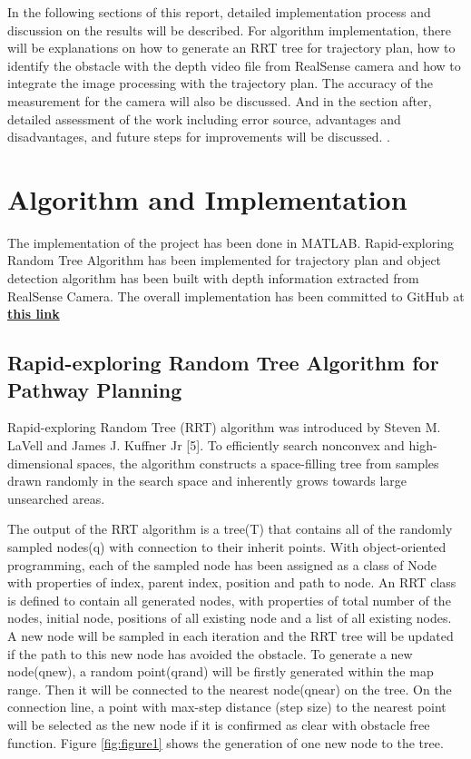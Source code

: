 \documentclass[
  oneside]{ubcthesis}
\begin{document}
In the following sections of this report, detailed implementation process and discussion on the results will be described. For algorithm implementation, there will be explanations on how to generate an RRT tree for trajectory plan, how to identify the obstacle with the depth video file from RealSense camera and how to integrate the image processing with the trajectory plan. The accuracy of the measurement for the camera will also be discussed. And in the section after, detailed assessment of the work including error source, advantages and disadvantages, and future steps for improvements will be discussed.
\citep{meyer2003pressures}.

\hypertarget{algorithm-and-implementation}{%
\chapter{Algorithm and Implementation}\label{algorithm-and-implementation}}

The implementation of the project has been done in MATLAB. Rapid-exploring Random Tree Algorithm has been implemented for trajectory plan and object detection algorithm has been built with depth information extracted from RealSense Camera. The overall implementation has been committed to GitHub at \textbf{\href{https://github.com/luckymeng7/EECE597}{this link}}

\hypertarget{rapid-exploring-random-tree-algorithm-for-pathway-planning}{%
\section{Rapid-exploring Random Tree Algorithm for Pathway Planning}\label{rapid-exploring-random-tree-algorithm-for-pathway-planning}}

Rapid-exploring Random Tree (RRT) algorithm was introduced by Steven M. LaVell and James J. Kuffner Jr {[}5{]}. To efficiently search nonconvex and high-dimensional spaces, the algorithm constructs a space-filling tree from samples drawn randomly in the search space and inherently grows towards large unsearched areas.

The output of the RRT algorithm is a tree(T) that contains all of the randomly sampled nodes(q) with connection to their inherit points. With object-oriented programming, each of the sampled node has been assigned as a class of Node with properties of index, parent index, position and path to node. An RRT class is defined to contain all generated nodes, with properties of total number of the nodes, initial node, positions of all existing node and a list of all existing nodes. A new node will be sampled in each iteration and the RRT tree will be updated if the path to this new node has avoided the obstacle. To generate a new node(qnew), a random point(qrand) will be firstly generated within the map range. Then it will be connected to the nearest node(qnear) on the tree. On the connection line, a point with max-step distance (step size) to the nearest point will be selected as the new node if it is confirmed as clear with obstacle free function. Figure \ref{fig:figure1} shows the generation of one new node to the tree.
\end{document}
